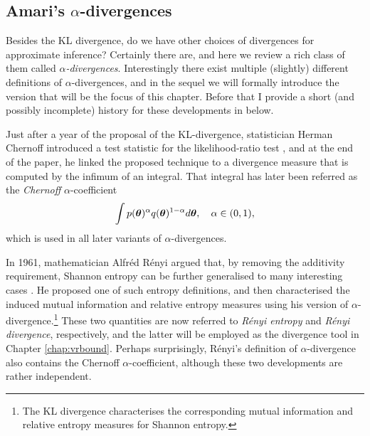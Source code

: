 \subsection{Amari's $\alpha$-divergences}
\label{sec:chap2_alpha_divergence}

Besides the KL divergence, do we have other choices of divergences for approximate inference? Certainly there are, and here we review a rich class of them called \emph{$\alpha$-divergences}. Interestingly there exist multiple (slightly) different definitions of $\alpha$-divergences, and in the sequel we will formally introduce the version that will be the focus of this chapter. Before that I provide a short (and possibly incomplete) history for these developments in below.

Just after a year of the proposal of the KL-divergence, statistician Herman Chernoff introduced a test statistic for the likelihood-ratio test \citep{chernoff:alpha1952}, and at the end of the paper, he linked the proposed technique to a divergence measure that is computed by the infimum of an integral. That integral has later been referred as the \emph{Chernoff} $\alpha$-coefficient 
$$\int p(\bm{\theta})^{\alpha} q(\bm{\theta})^{1 - \alpha} d\bm{\theta}, \quad \alpha \in (0, 1),$$
which is used in all later variants of $\alpha$-divergences. 

In 1961, mathematician Alfr{\'e}d R{\'e}nyi argued that, by removing the additivity requirement, Shannon entropy can be further generalised to many interesting cases \citep{renyi:divergence1961}. He proposed one of such entropy definitions, and then characterised the induced mutual information and relative entropy measures using his version of $\alpha$-divergence.\footnote{The KL divergence characterises the corresponding mutual information and relative entropy measures for Shannon entropy. } These two quantities are now referred to \emph{R{\'e}nyi entropy} and \emph{R{\'e}nyi divergence}, respectively, and the latter will be employed as the divergence tool in Chapter \ref{chap:vrbound}. Perhaps surprisingly, R{\'e}nyi's definition of $\alpha$-divergence also contains the Chernoff $\alpha$-coefficient, although these two developments are rather independent.

